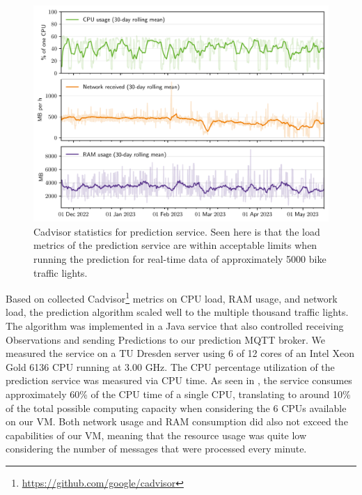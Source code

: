 \begin{figure}[t]
    \centering
    \includegraphics[width=\linewidth]{images/monitoring-prediction-service-load.pdf}
    \caption{Cadvisor statistics for prediction service. Seen here is that the load metrics of the prediction service are within acceptable limits when running the prediction for real-time data of approximately 5000 bike traffic lights.}\label{fig:monitoring-prediction-service-load}
\end{figure}

Based on collected Cadvisor\footnote{\url{https://github.com/google/cadvisor}} metrics on CPU load, RAM usage, and network load, the prediction algorithm scaled well to the multiple thousand traffic lights. The algorithm was implemented in a Java service that also controlled receiving Observations and sending Predictions to our prediction MQTT broker. We measured the service on a TU Dresden server using 6 of 12 cores of an Intel Xeon Gold 6136 CPU running at 3.00 GHz. The CPU percentage utilization of the prediction service was measured via CPU time. As seen in , the service consumes approximately 60\% of the CPU time of a single CPU, translating to around 10\% of the total possible computing capacity when considering the 6 CPUs available on our VM. Both network usage and RAM consumption did also not exceed the capabilities of our VM, meaning that the resource usage was quite low considering the number of messages that were processed every minute.

